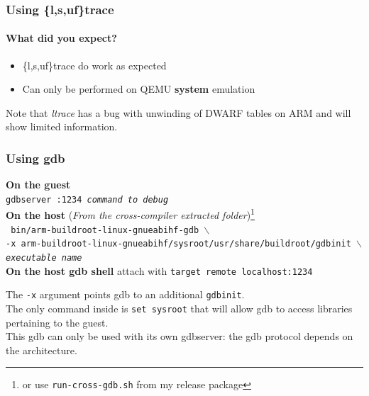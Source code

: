 \begin{frame}
  \frametitle{Using \{l,s,uf\}trace}
   {
    \framesubtitle{What did you expect?}
  }
  \begin{itemize}
    \item \{l,s,uf\}trace do work as expected
    \item Can only be performed on QEMU \textbf{system} emulation
  \end{itemize}
  Note that \textit{ltrace} has a bug with unwinding of DWARF tables on ARM and will show limited information.
\end{frame}
\begin{frame}
  \frametitle{\hypertarget{using gdb}{Using gdb}}
  \textbf{On the guest} \\
  \texttt{gdbserver :1234 \textit{command to debug}} \\
  \textbf{On the host} (\textit{From the cross-compiler extracted folder})\footnote{or use \texttt{run-cross-gdb.sh} from my release package} \\
  \texttt{
    \small
    bin/{\tiny arm-buildroot-linux-gnueabihf-}gdb $\backslash$ \\
      \quad -x {\tiny arm-buildroot-linux-gnueabihf}/sysroot/usr/share/buildroot/gdbinit $\backslash$ \\
      \quad \textit{executable name}
  } \\
  \textbf{On the host gdb shell} attach with \texttt{target remote localhost:1234}
\end{frame}
 {
  The \texttt{-x} argument points gdb to an additional \texttt{gdbinit}. \\
  The only command inside is \texttt{set sysroot} that will allow gdb to access libraries pertaining to the guest. \\
  This gdb can only be used with its own gdbserver: the gdb protocol depends on the architecture. \\
}

